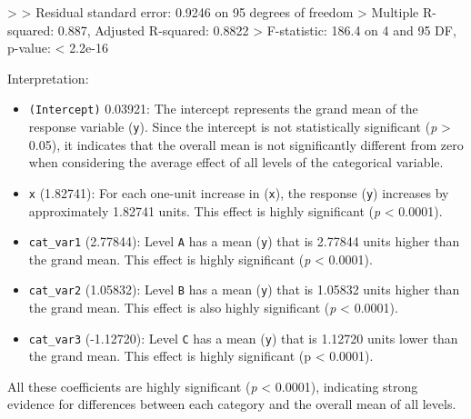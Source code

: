 \documentclass[
  letterpaper,
]{book}
\newenvironment{Shaded}{\begin{snugshade}}{\end{snugshade}}
\newcommand{\DecValTok}[1]{\textcolor[rgb]{0.68,0.00,0.00}{#1}}
\newcommand{\ErrorTok}[1]{\textcolor[rgb]{0.68,0.00,0.00}{#1}}
\newcommand{\FloatTok}[1]{\textcolor[rgb]{0.68,0.00,0.00}{#1}}
\newcommand{\NormalTok}[1]{\textcolor[rgb]{0.00,0.23,0.31}{#1}}
\newcommand{\SpecialCharTok}[1]{\textcolor[rgb]{0.37,0.37,0.37}{#1}}
\providecommand{\tightlist}{%
  \setlength{\itemsep}{0pt}\setlength{\parskip}{0pt}}\usepackage{longtable,booktabs,array}
\begin{document}
\begin{Shaded}
\begin{Highlighting}[]
\SpecialCharTok{\textgreater{}} 
\ErrorTok{\textgreater{}}\NormalTok{ Residual standard error}\SpecialCharTok{:} \FloatTok{0.9246}\NormalTok{ on }\DecValTok{95}\NormalTok{ degrees of freedom}
\SpecialCharTok{\textgreater{}}\NormalTok{ Multiple R}\SpecialCharTok{{-}}\NormalTok{squared}\SpecialCharTok{:}  \FloatTok{0.887}\NormalTok{,   Adjusted R}\SpecialCharTok{{-}}\NormalTok{squared}\SpecialCharTok{:}  \FloatTok{0.8822} 
\SpecialCharTok{\textgreater{}}\NormalTok{ F}\SpecialCharTok{{-}}\NormalTok{statistic}\SpecialCharTok{:} \FloatTok{186.4}\NormalTok{ on }\DecValTok{4}\NormalTok{ and }\DecValTok{95}\NormalTok{ DF,  p}\SpecialCharTok{{-}}\NormalTok{value}\SpecialCharTok{:} \ErrorTok{\textless{}} \FloatTok{2.2e{-}16}
\end{Highlighting}
\end{Shaded}

Interpretation:

\begin{itemize}
\tightlist
\item
  \texttt{(Intercept)} 0.03921: The intercept represents the grand mean
  of the response variable (\texttt{y}). Since the intercept is not
  statistically significant (\emph{p} \textgreater{} 0.05), it indicates
  that the overall mean is not significantly different from zero when
  considering the average effect of all levels of the categorical
  variable.
\item
  \texttt{x} (1.82741): For each one-unit increase in (\texttt{x}), the
  response (\texttt{y}) increases by approximately 1.82741 units. This
  effect is highly significant (\emph{p} \textless{} 0.0001).
\item
  \texttt{cat\_var1} (2.77844): Level \texttt{A} has a mean (\texttt{y})
  that is 2.77844 units higher than the grand mean. This effect is
  highly significant (\emph{p} \textless{} 0.0001).
\item
  \texttt{cat\_var2} (1.05832): Level \texttt{B} has a mean (\texttt{y})
  that is 1.05832 units higher than the grand mean. This effect is also
  highly significant (\emph{p} \textless{} 0.0001).
\item
  \texttt{cat\_var3} (-1.12720): Level \texttt{C} has a mean
  (\texttt{y}) that is 1.12720 units lower than the grand mean. This
  effect is highly significant (p \textless{} 0.0001).
\end{itemize}

All these coefficients are highly significant (\emph{p} \textless{}
0.0001), indicating strong evidence for differences between each
category and the overall mean of all levels.
\end{document}
